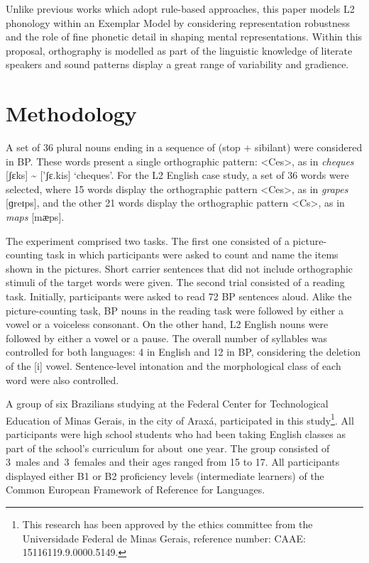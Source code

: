 Unlike previous works which adopt rule-based approaches, this paper
models L2 phonology within an Exemplar Model by considering
representation robustness and the role of fine phonetic detail in
shaping mental representations. Within this proposal, orthography is
modelled as part of the linguistic knowledge of literate speakers and
sound patterns display a great range of variability and gradience.


\section{Methodology}
A set of 36 plural nouns ending in a sequence of (stop + sibilant) were
considered in BP. These words present a single orthographic pattern:
\textless Ces\textgreater, as in \emph{cheques} {[}ʃɛks{]}
\textasciitilde{} {[}'ʃɛ.kis{]} `cheques'. For the L2 English case
study, a set of 36 words were selected, where 15 words display the
orthographic pattern \textless Ces\textgreater, as in \emph{grapes}
{[}ɡreɪps{]}, and the other 21 words display the orthographic pattern
\textless Cs\textgreater, as in \emph{maps} {[}mӕps{]}.

The experiment comprised two tasks. The first one consisted of a
picture-counting task in which participants were asked to count and name
the items shown in the pictures. Short carrier sentences that did not
include orthographic stimuli of the target words were given. The second
trial consisted of a reading task. Initially, participants were asked to
read 72 BP sentences aloud. Alike the picture-counting task, BP nouns in
the reading task were followed by either a vowel or a voiceless
consonant. On the other hand, L2 English nouns were followed by either a
vowel or a pause. The overall number of syllables was controlled for
both languages: 4 in English and 12 in BP, considering the deletion of
the {[}i{]} vowel. Sentence-level intonation and the morphological class
of each word were also controlled.

A group of six Brazilians studying at the Federal Center for
Technological Education of Minas Gerais, in the city of Araxá,
participated in this study\footnote{This research has been approved by
the ethics committee from the Universidade Federal de Minas Gerais,
reference number: CAAE: 15116119.9.0000.5149.}. All participants were
high school students who had been taking English classes as part of the
school's curriculum for about~one year. The group consisted of 3~males
and~3~females and their ages ranged from 15 to 17. All participants
displayed either B1 or B2 proficiency levels (intermediate learners) of
the Common European Framework of Reference for Languages.

